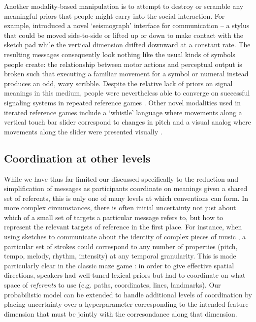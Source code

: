 \documentclass[11pt, floatsintext, jou]{apa6}
\begin{document}

Another modality-based manipulation is to attempt to destroy or scramble any meaningful priors that people might carry into the social interaction. For example,  introduced a novel `seismograph' interface for communication -- a stylus that could be moved side-to-side or lifted up or down to make contact with the sketch pad while the vertical dimension drifted downward at a constant rate. The resulting messages consequently look nothing like the usual kinds of symbols people create: the relationship between motor actions and perceptual output is broken such that executing a familiar movement for a symbol or numeral instead produces an odd, wavy scribble. Despite the relative lack of priors on signal meanings in this medium, people were nevertheless able to converge on successful signaling systems in repeated reference games \cite{RobertsGalantucci12_DualityOfPatterning,RobertsEtAl15_IconocityOnCombinatoriality}. Other novel modalities used in iterated reference games include a `whistle' language where movements along a vertical touch bar slider correspond to changes in pitch \cite{VerhoefRobertsDingemanse15_Iconicity} and a visual analog where movements along the slider were presented visually \cite{VerhoefEtAl16_TemporalLanguage}.

\subsection{Coordination at other levels}

While we have thus far limited our discussed specifically to the reduction and simplification of messages as participants coordinate on meanings given a shared set of referents, this is only one of many levels at which conventions can form. In more complex circumstances, there is often initial uncertainty not just about which of a small set of targets a particular message refers to, but how to represent the relevant targets of reference in the first place. For instance, when using sketches to communicate about the identity of complex pieces of music \cite{HealeySwobodaUmataKing07_GraphicalLanguageGames}, a particular set of strokes could correspond to any number of properties (pitch, tempo, melody, rhythm, intensity) at any temporal granularity. This is made particularly clear in the classic maze game \cite{GarrodAnderson87_SayingWhatYouMean}: in order to give effective spatial directions, speakers had well-tuned lexical priors but had to coordinate on what space of \emph{referents} to use (e.g. paths, coordinates, lines, landmarks). Our probabilistic model can be extended to handle additional levels of coordination by placing uncertainty over a hyperparameter corresponding to the intended feature dimension that must be jointly with the corresondance along that dimension. 
\end{document}
